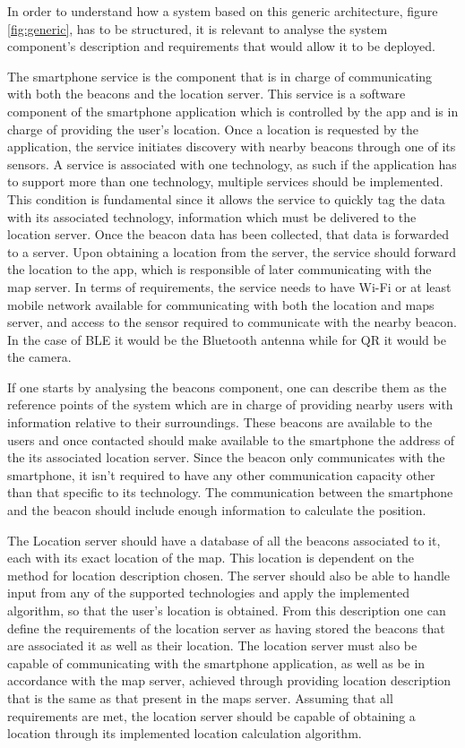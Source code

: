  
In order to understand how a system based on this generic architecture, figure \ref{fig:generic}, has to be structured, it is relevant to analyse the system component's description and requirements that would allow it to be deployed.  
 
 
The smartphone service is the component that is in charge of communicating with both the beacons and the location server. This service is a software component of the smartphone application which is controlled by the app and is in charge of providing the user's location. Once a location is requested by the application, the service initiates discovery with nearby beacons through one of its sensors. A service is associated with one technology, as such if the application has to support more than one technology, multiple services should be implemented. This condition is fundamental since it allows the service to quickly tag the data with its associated technology, information which must be delivered to the location server. Once the beacon data has been collected, that data is forwarded to a server. Upon obtaining a location from the server, the service should forward the location to the app, which is responsible of later communicating with the map server. In terms of requirements, the service needs to have Wi-Fi or at least mobile network available for communicating with both the location and maps server, and access to the sensor required to communicate with the nearby beacon. In the case of BLE it would be the Bluetooth antenna while for QR it would be the camera. 
 
 
If one starts by analysing the beacons component, one can describe them as the reference points of the system which are in charge of providing nearby users with information relative to their surroundings. These beacons are available to the users and once contacted should make available to the smartphone the address of the its associated location server. Since the beacon only communicates with the smartphone, it isn't required to have any other communication capacity other than that specific to its technology. The communication between the smartphone and the beacon should include enough information to calculate the position. 
 
 
The Location server should have a database of all the beacons associated to it, each with its exact location of the map. This location is dependent on the method for location description chosen. The server should also be able to handle input from any of the supported technologies and apply the implemented algorithm, so that the user's location is obtained. From this description one can define the requirements of the location server as having stored the beacons that are associated it as well as their location. The location server must also be capable of communicating with the smartphone application, as well as be in accordance with the map server, achieved through providing location description that is the same as that present in the maps server. Assuming that all requirements are met, the location server should be capable of obtaining a location through its implemented location calculation algorithm. 
 
